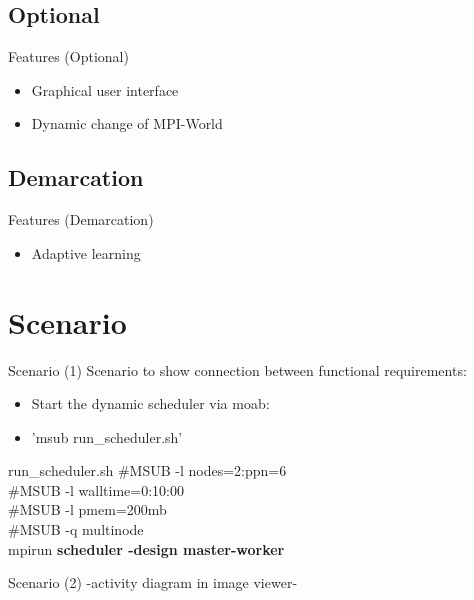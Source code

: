 \documentclass[18pt]{beamer}
\begin{document}
	\subsection{Optional}
	\begin{frame}{Features (Optional)}
		\begin{itemize}
			\pause
			\item Graphical user interface			
			\pause
			\item Dynamic change of MPI-World
		\end{itemize}
	\end{frame}
	
	\subsection{Demarcation}
	\begin{frame}{Features (Demarcation)}
		\begin{itemize}
			\pause
			\item Adaptive learning
		\end{itemize}
	\end{frame}

\section{Scenario}
	\begin{frame}{Scenario (1)}
		Scenario to show connection between functional requirements:
		\pause
		\begin{itemize}
			\item Start the dynamic scheduler via moab:
			\item 'msub run\_scheduler.sh'
		\end{itemize}
		\begin{block}{run\_scheduler.sh}
			\#MSUB -l nodes=2:ppn=6 \\
			\#MSUB -l walltime=0:10:00 \\
			\#MSUB -l pmem=200mb \\
			\#MSUB -q multinode \\
			mpirun \textbf{scheduler -design master-worker}
		\end{block}
	\end{frame}
	\begin{frame}{Scenario (2)}
		\center -activity diagram in image viewer-
	\end{frame}
\end{document}
